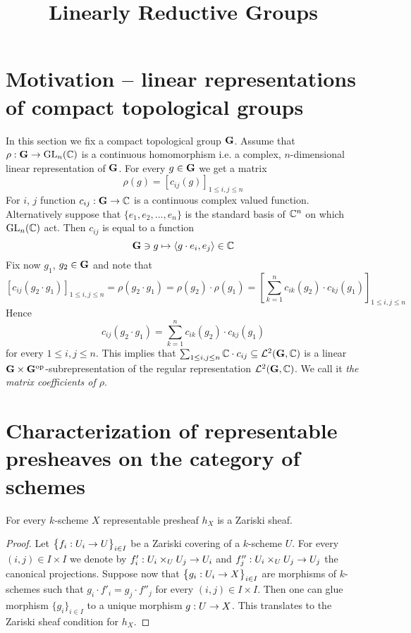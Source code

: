 



\title{Linearly Reductive Groups}
\date{}
\maketitle

\section{Motivation -- linear representations of compact topological groups}
\noindent
In this section we fix a compact topological group $\mathbf{G}$.
Assume that $\rho:\mathbf{G}\rightarrow \mathrm{GL}_n({\mathbb C})$ is a continuous homomorphism i.e. a complex, $n$-dimensional linear representation of $\mathbf{G}$. For every $g\in \mathbf{G}$ we get a matrix
$$\rho(g)=\left[c_{ij}(g)\right]_{1\leq i, j \leq n}$$
For $i$, $j$ function $c_{ij}:\mathbf{G}\rightarrow {\mathbb C}$ is a continuous complex valued function. Alternatively suppose that $\{e_1,e_2,...,e_n\}$ is the standard basis of ${\mathbb C}^n$ on which $\mathrm{GL}_n({\mathbb C})$ act. Then $c_{ij}$ is equal to a function 
$$\mathbf{G}\ni g \mapsto \langle g\cdot e_i, e_j\rangle \in {\mathbb C}$$
Fix now $g_1$, $g_2\in \mathbf{G}$ and note that
$$\left[c_{ij}(g_2\cdot g_1)\right]_{1\leq i,j\leq n}  = \rho(g_2\cdot g_1) = \rho(g_2)\cdot \rho(g_1) = \left[\sum_{k=1}^nc_{ik}(g_2)\cdot c_{kj}(g_1)\right]_{1\leq i,j\leq n}$$
Hence 
$$c_{ij}(g_2\cdot g_1) = \sum_{k=1}^nc_{ik}(g_2)\cdot c_{kj}(g_1)$$
for every $1\leq i,j\leq n$. This implies that $\sum_{1\leq i,j\leq n}{\mathbb C}\cdot c_{ij}\subseteq {\mathcal L}^2(\mathbf{G},{\mathbb C})$ is a linear $\mathbf{G}\times \mathbf{G}^{\mathrm{op}}$-subrepresentation of the regular representation ${\mathcal L}^2(\mathbf{G},{\mathbb C})$. We call it \textit{the matrix coefficients of $\rho$}. 

\section{Characterization of representable presheaves on the category of schemes}

\begin{fact}\label{fact:zariskitopologysubcanonical}
For every $k$-scheme $X$ representable presheaf $h_X$ is a Zariski sheaf.
\end{fact}
\begin{proof}
Let $\big\{f_i:U_i\rightarrow U\big\}_{i\in I}$ be a Zariski covering of a $k$-scheme $U$. For every $(i,j)\in I\times I$ we denote by $f'_i:U_i\times_UU_j\rightarrow U_i$ and $f''_j:U_i\times_UU_j\rightarrow U_j$ the canonical projections. Suppose now that $\big\{g_i:U_i\rightarrow X\big\}_{i\in I}$ are morphisms of $k$-schemes such that $g_i\cdot f'_i=g_j\cdot f''_j$ for every $(i,j)\in I\times I$. Then one can glue morphism $\{g_i\}_{i\in I}$ to a unique morphism $g:U\rightarrow X$. This translates to the Zariski sheaf condition for $h_X$.
\end{proof}

